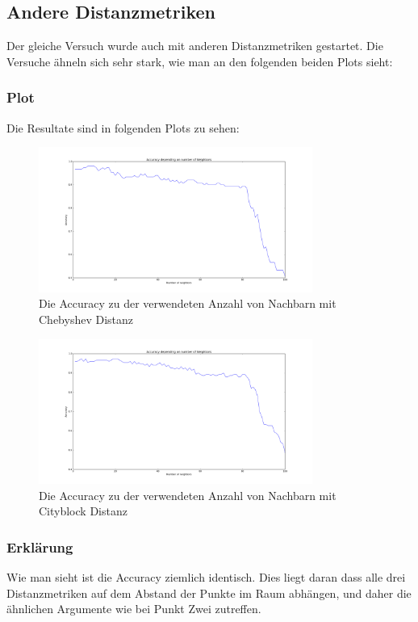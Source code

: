 \documentclass{article}
\begin{document}
\subsection{Andere Distanzmetriken}
Der gleiche Versuch wurde auch mit anderen Distanzmetriken gestartet. Die Versuche ähneln sich sehr stark, wie man an den folgenden beiden Plots sieht:

\subsubsection{Plot}
Die Resultate sind in folgenden Plots zu sehen:
\begin{figure}[h]
    \centering
    \includegraphics[width=0.8\textwidth]{chebyshev.png}
    \caption{Die Accuracy zu der verwendeten Anzahl von Nachbarn mit Chebyshev Distanz}
    \label{fig:cheby}
\end{figure}

\begin{figure}[h]
    \centering
    \includegraphics[width=0.8\textwidth]{cityblock.png}
    \caption{Die Accuracy zu der verwendeten Anzahl von Nachbarn mit Cityblock Distanz}
    \label{fig:city}
\end{figure}
\FloatBarrier
\subsubsection{Erklärung}
Wie man sieht ist die Accuracy ziemlich identisch. Dies liegt daran dass alle drei Distanzmetriken auf dem Abstand der Punkte im Raum abhängen, und daher die ähnlichen Argumente wie bei Punkt Zwei zutreffen.
\end{document}
